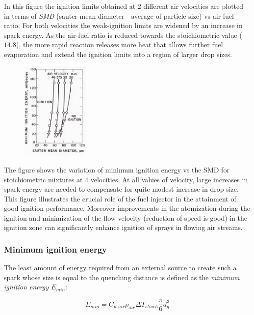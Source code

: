 \documentclass[12pt]{article}
\begin{document}
In this figure the ignition limits obtained at 2 different air velocities are plotted in terms of \textit{SMD} (sauter mean diameter - average of particle size) vs air-fuel ratio. For both velocities the weak-ignition limits are widened by an increase in spark energy. As the air-fuel ratio is reduced towards the stoichiometric value ($14.8$), the more rapid reaction releases more heat that allows further fuel evaporation and extend the ignition limits into a region of larger drop sizes.

\begin{figure}[h!]
\centering
\includegraphics[width=0.3\textwidth]{figures/kerosene3.png}
\end{figure}

The figure shows the variation of minimum ignition energy vs the SMD for stoichiometric mixtures at 4 velocities. At all values of velocity, large increases in spark energy are needed to compensate for quite modest increase in drop size. This figure illustrates the crucial role of the fuel injector in the attainment of good ignition performance. Moreover improvements in the atomization during the ignition and minimization of the flow velocity (reduction of speed is good) in the ignition zone can significantly enhance ignition of sprays in flowing air streams.

\subsubsection{Minimum ignition energy}

The least amount of energy required from an external source to create such a spark whose size is equal to the quenching distance is defined as the \textit{minimum ignition energy $E_{min}$}:

\begin{equation}
    E_{min} = C_{p, air}\rho_{air}\Delta T_{stoich} \frac{\pi}{6}d_{q}^{3}
\end{equation}
\end{document}
